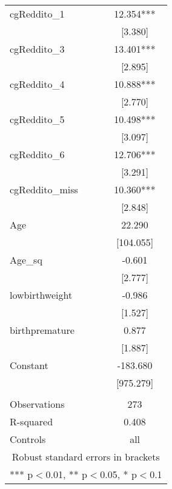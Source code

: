 \documentclass[]{article}
\begin{document}
\begin{tabular}{lc}
cgReddito\_1 & 12.354*** \\
 & [3.380] \\
cgReddito\_3 & 13.401*** \\
 & [2.895] \\
cgReddito\_4 & 10.888*** \\
 & [2.770] \\
cgReddito\_5 & 10.498*** \\
 & [3.097] \\
cgReddito\_6 & 12.706*** \\
 & [3.291] \\
cgReddito\_miss & 10.360*** \\
 & [2.848] \\
Age & 22.290 \\
 & [104.055] \\
Age\_sq & -0.601 \\
 & [2.777] \\
lowbirthweight & -0.986 \\
 & [1.527] \\
birthpremature & 0.877 \\
 & [1.887] \\
Constant & -183.680 \\
 & [975.279] \\
 &  \\
Observations & 273 \\
R-squared & 0.408 \\
 Controls & all \\ \hline
\multicolumn{2}{c}{ Robust standard errors in brackets} \\
\multicolumn{2}{c}{ *** p$<$0.01, ** p$<$0.05, * p$<$0.1} \\
\end{tabular}
\end{document}
